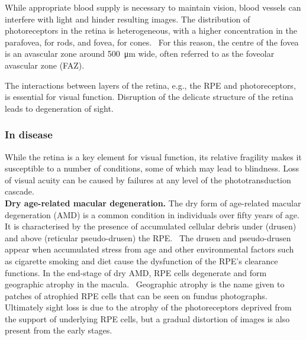 \documentclass[12pt,a4paper]{journal}
\begin{document}
While appropriate blood supply is necessary to maintain vision, blood vessels can interfere with light and hinder resulting images.
The distribution of photoreceptors in the retina is heterogeneous, with a higher concentration in the parafovea, for rods, and fovea, for cones.~\cite{Zouache_2022}
For this reason, the centre of the fovea is an avascular zone around \SI{500}{\micro\meter} wide, often referred to as the foveolar avascular zone (FAZ).

The interactions between layers of the retina, e.g., the RPE and photoreceptors, is essential for visual function.
Disruption of the delicate structure of the retina leads to degeneration of sight.

\subsubsection*{In disease}



While the retina is a key element for visual function, its relative fragility makes it susceptible to a number of conditions, some of which may lead to blindness.
Loss of visual acuity can be caused by failures at any level of the phototransduction cascade.\\

\textbf{Dry age-related macular degeneration.}
The dry form of age-related macular degeneration (AMD) is a common condition in individuals over fifty years of age.
It is characterised by the presence of accumulated cellular debris under (drusen) and above (reticular pseudo-drusen) the RPE.~\cite{Bottos_2012}
The drusen and pseudo-drusen appear when accumulated stress from age and other environmental factors such as cigarette smoking and diet cause the dysfunction of the RPE's clearance functions.
In the end-stage of dry AMD, RPE cells degenerate and form geographic atrophy in the macula.~\cite{Jager_2008}
Geographic atrophy is the name given to patches of atrophied RPE cells that can be seen on fundus photographs.
Ultimately sight loss is due to the atrophy of the photoreceptors deprived from the support of underlying RPE cells, but a gradual distortion of images is also present from the early stages.~\cite{Newsom_2008,Zacks_2022}\\
\end{document}
